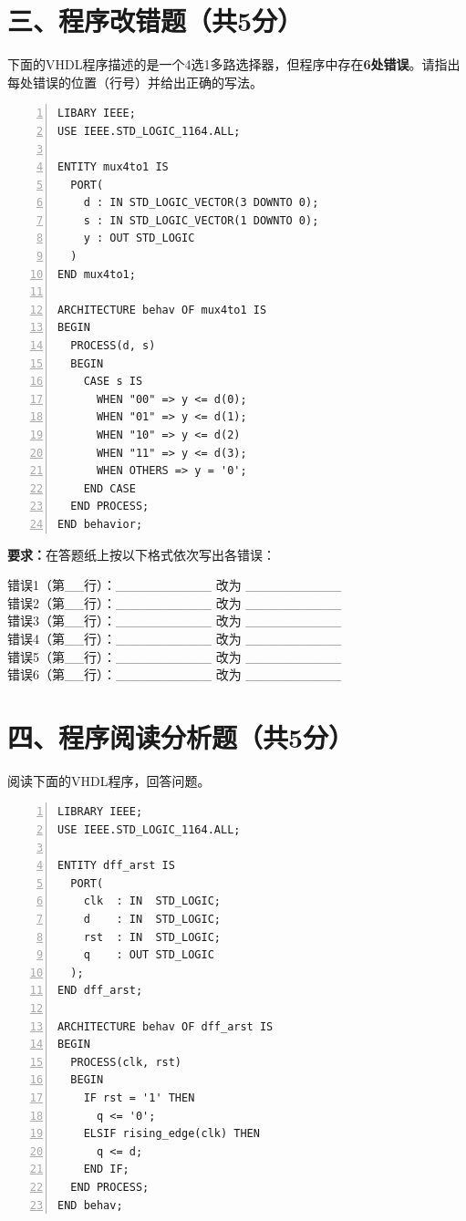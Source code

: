 \newpage

\section*{三、程序改错题（共5分）}

下面的VHDL程序描述的是一个4选1多路选择器，但程序中存在\textbf{6处错误}。请指出每处错误的位置（行号）并给出正确的写法。

\begin{lstlisting}[language=VDL, numbers=left]
LIBARY IEEE;
USE IEEE.STD_LOGIC_1164.ALL;

ENTITY mux4to1 IS
  PORT(
    d : IN STD_LOGIC_VECTOR(3 DOWNTO 0);
    s : IN STD_LOGIC_VECTOR(1 DOWNTO 0);
    y : OUT STD_LOGIC
  )
END mux4to1;

ARCHITECTURE behav OF mux4to1 IS
BEGIN
  PROCESS(d, s)
  BEGIN
    CASE s IS
      WHEN "00" => y <= d(0);
      WHEN "01" => y <= d(1);
      WHEN "10" => y <= d(2)
      WHEN "11" => y <= d(3);
      WHEN OTHERS => y = '0';
    END CASE
  END PROCESS;
END behavior;
\end{lstlisting}

\medskip
\noindent\textbf{要求：}在答题纸上按以下格式依次写出各错误：

\begin{framed}
\noindent 错误1（第\_\_行）：\_\_\_\_\_\_\_\_\_\_ 改为 \_\_\_\_\_\_\_\_\_\_ \\
错误2（第\_\_行）：\_\_\_\_\_\_\_\_\_\_ 改为 \_\_\_\_\_\_\_\_\_\_ \\
错误3（第\_\_行）：\_\_\_\_\_\_\_\_\_\_ 改为 \_\_\_\_\_\_\_\_\_\_ \\
错误4（第\_\_行）：\_\_\_\_\_\_\_\_\_\_ 改为 \_\_\_\_\_\_\_\_\_\_ \\
错误5（第\_\_行）：\_\_\_\_\_\_\_\_\_\_ 改为 \_\_\_\_\_\_\_\_\_\_ \\
错误6（第\_\_行）：\_\_\_\_\_\_\_\_\_\_ 改为 \_\_\_\_\_\_\_\_\_\_
\end{framed}

\newpage

\section*{四、程序阅读分析题（共5分）}

阅读下面的VHDL程序，回答问题。

\begin{lstlisting}[language=VDL, numbers=left]
LIBRARY IEEE;
USE IEEE.STD_LOGIC_1164.ALL;

ENTITY dff_arst IS
  PORT(
    clk  : IN  STD_LOGIC;
    d    : IN  STD_LOGIC;
    rst  : IN  STD_LOGIC;
    q    : OUT STD_LOGIC
  );
END dff_arst;

ARCHITECTURE behav OF dff_arst IS
BEGIN
  PROCESS(clk, rst)
  BEGIN
    IF rst = '1' THEN
      q <= '0';
    ELSIF rising_edge(clk) THEN
      q <= d;
    END IF;
  END PROCESS;
END behav;
\end{lstlisting}

